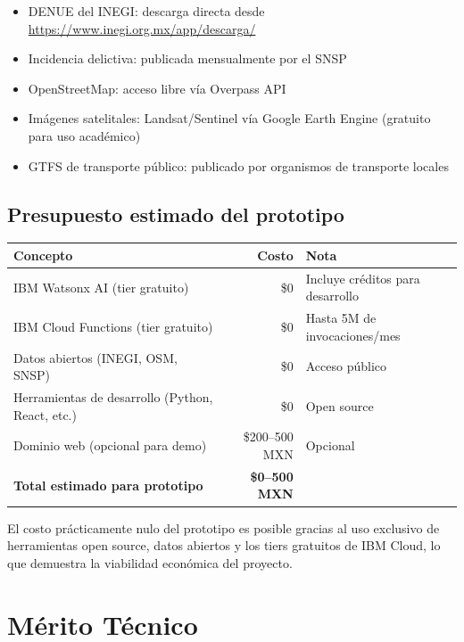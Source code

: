 \documentclass[12pt,a4paper]{article}
\begin{document}
\begin{itemize}[leftmargin=1.5cm]
    \item DENUE del INEGI: descarga directa desde \url{https://www.inegi.org.mx/app/descarga/}
    \item Incidencia delictiva: publicada mensualmente por el SNSP
    \item OpenStreetMap: acceso libre vía Overpass API
    \item Imágenes satelitales: Landsat/Sentinel vía Google Earth Engine (gratuito para uso académico)
    \item GTFS de transporte público: publicado por organismos de transporte locales
\end{itemize}


\subsection{Presupuesto estimado del prototipo}

\begin{table}[H]
\centering
\small
\begin{tabularx}{\textwidth}{X r l}
\toprule
\textbf{Concepto} & \textbf{Costo} & \textbf{Nota} \\
\midrule
IBM Watsonx AI (tier gratuito) & \$0 & Incluye créditos para desarrollo \\
IBM Cloud Functions (tier gratuito) & \$0 & Hasta 5M de invocaciones/mes \\
Datos abiertos (INEGI, OSM, SNSP) & \$0 & Acceso público \\
Herramientas de desarrollo (Python, React, etc.) & \$0 & Open source \\
Dominio web (opcional para demo) & \$200--500 MXN & Opcional \\
\midrule
\textbf{Total estimado para prototipo} & \textbf{\$0--500 MXN} & \\
\bottomrule
\end{tabularx}
\end{table}

El costo prácticamente nulo del prototipo es posible gracias al uso exclusivo de herramientas open source, datos abiertos y los tiers gratuitos de IBM Cloud, lo que demuestra la viabilidad económica del proyecto.


\section{Mérito Técnico}
\end{document}
